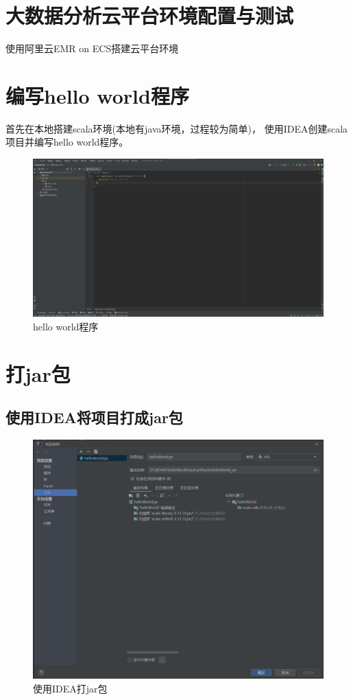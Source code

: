 \section*{大数据分析云平台环境配置与测试}
使用阿里云EMR on ECS搭建云平台环境

\section{编写hello world程序}
首先在本地搭建scala环境(本地有java环境，过程较为简单)，
使用IDEA创建scala项目并编写hello world程序。
\begin{figure}[H]
  \centering
  \includegraphics[width=\textwidth]{figure/code.png}
  \caption{hello world程序}
  \label{fig:my_label}
\end{figure}

    
\section{打jar包}
\subsection{使用IDEA将项目打成jar包}
\begin{figure}[H]
  \centering
  \includegraphics[width=\textwidth]{figure/jar.png}
  \caption{使用IDEA打jar包}
  \label{fig:my_label}
\end{figure}

